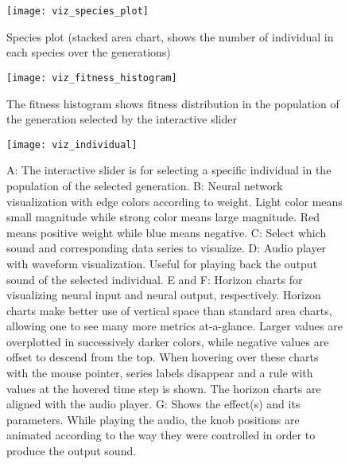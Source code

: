 \begin{figure}[h]
    \centering
    \texttt{[image: viz\_species\_plot]}
    \caption{Species plot (stacked area chart, shows the number of individual in each species over the generations)}
    \label{fig:viz_species_plot}
\end{figure}


\begin{figure}[h]
    \centering
    \texttt{[image: viz\_fitness\_histogram]}
    \caption{The fitness histogram shows fitness distribution in the population of the generation selected by the interactive slider}
    \label{fig:viz_fitness_histogram}
\end{figure}

\begin{figure}[h]
    \centering
    \texttt{[image: viz\_individual]}
    \caption{A: The interactive slider is for selecting a specific individual in the population of the selected generation. B: Neural network visualization with edge colors according to weight. Light color means small magnitude while strong color means large magnitude. Red means positive weight while blue means negative. C: Select which sound and corresponding data series to visualize. D: Audio player with waveform visualization. Useful for playing back the output sound of the selected individual. E and F: Horizon charts for visualizing neural input and neural output, respectively. Horizon charts make better use of vertical space than standard area charts, allowing one to see many more metrics at-a-glance. Larger values are overplotted in successively darker colors, while negative values are offset to descend from the top. When hovering over these charts with the mouse pointer, series labels disappear and a rule with values at the hovered time step is shown. The horizon charts are aligned with the audio player. G: Shows the effect(s) and its parameters. While playing the audio, the knob positions are animated according to the way they were controlled in order to produce the output sound.}
    \label{fig:viz_individual}
\end{figure}


